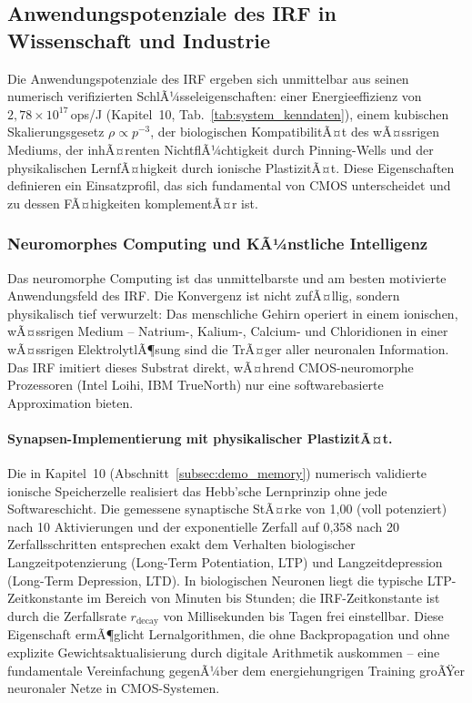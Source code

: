 ﻿\documentclass[a4paper,12pt]{scrreprt}
\theoremstyle{definition}
\begin{document}
\subsection{Anwendungspotenziale des IRF in Wissenschaft und Industrie}
\label{sec:anwendungen}

Die Anwendungspotenziale des IRF ergeben sich unmittelbar aus seinen
numerisch verifizierten SchlÃ¼sseleigenschaften: einer Energieeffizienz von
$2{,}78 \times 10^{17}$\,ops/J (Kapitel~10, Tab.~\ref{tab:system_kenndaten}),
einem kubischen Skalierungsgesetz $\rho \propto p^{-3}$, der biologischen
KompatibilitÃ¤t des wÃ¤ssrigen Mediums, der inhÃ¤renten NichtflÃ¼chtigkeit durch
Pinning-Wells und der physikalischen LernfÃ¤higkeit durch ionische PlastizitÃ¤t.
Diese Eigenschaften definieren ein Einsatzprofil, das sich fundamental von
CMOS unterscheidet und zu dessen FÃ¤higkeiten komplementÃ¤r ist.

\subsubsection{Neuromorphes Computing und KÃ¼nstliche Intelligenz}
\label{subsubsec:neuromorph}

Das neuromorphe Computing ist das unmittelbarste und am besten
motivierte Anwendungsfeld des IRF. Die Konvergenz ist nicht zufÃ¤llig,
sondern physikalisch tief verwurzelt: Das menschliche Gehirn operiert in
einem ionischen, wÃ¤ssrigen Medium -- Natrium-, Kalium-, Calcium- und
Chloridionen in einer wÃ¤ssrigen ElektrolytlÃ¶sung sind die TrÃ¤ger aller
neuronalen Information. Das IRF imitiert dieses Substrat direkt, wÃ¤hrend
CMOS-neuromorphe Prozessoren (Intel Loihi, IBM TrueNorth) nur eine
softwarebasierte Approximation bieten.

\paragraph{Synapsen-Implementierung mit physikalischer PlastizitÃ¤t.}
Die in Kapitel~10 (Abschnitt~\ref{subsec:demo_memory}) numerisch validierte
ionische Speicherzelle realisiert das Hebb'sche Lernprinzip ohne jede
Softwareschicht. Die gemessene synaptische StÃ¤rke von 1,00 (voll potenziert)
nach 10 Aktivierungen und der exponentielle Zerfall auf 0,358 nach
20 Zerfallsschritten entsprechen exakt dem Verhalten biologischer
Langzeitpotenzierung (Long-Term Potentiation, LTP) und
Langzeitdepression (Long-Term Depression, LTD). In biologischen
Neuronen liegt die typische LTP-Zeitkonstante im Bereich von Minuten
bis Stunden; die IRF-Zeitkonstante ist durch die Zerfallsrate $r_\text{decay}$
von Millisekunden bis Tagen frei einstellbar. Diese Eigenschaft
ermÃ¶glicht Lernalgorithmen, die ohne Backpropagation und ohne
explizite Gewichtsaktualisierung durch digitale Arithmetik auskommen --
eine fundamentale Vereinfachung gegenÃ¼ber dem energiehungrigen Training
groÃŸer neuronaler Netze in CMOS-Systemen.
\end{document}
